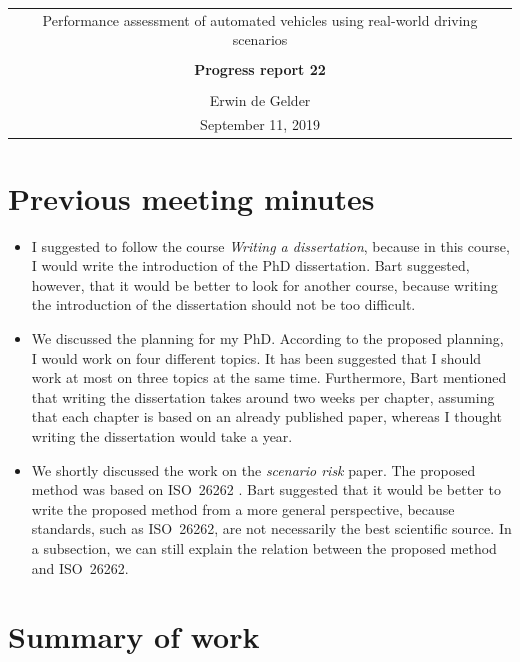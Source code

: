 \documentclass[10pt,final,a4paper,oneside,onecolumn]{article}
\newcommand{\progressreportnumber}{22}
\renewcommand{\author}{Erwin de Gelder}
\renewcommand{\date}{September 11, 2019}
\renewcommand{\title}{Performance assessment of automated vehicles using real-world driving scenarios}
\begin{document}
	
\begin{center}
	\begin{tabular}{c}
		\title \\ \\
		\textbf{\huge Progress report \progressreportnumber} \\ \\
		\author \\ 
		\date
	\end{tabular}
\end{center}

\section{Previous meeting minutes}

\begin{itemize}
	\item I suggested to follow the course \emph{Writing a dissertation}, because in this course, I would write the introduction of the PhD dissertation. Bart suggested, however, that it would be better to look for another course, because writing the introduction of the dissertation should not be too difficult. 
	\item We discussed the planning for my PhD. According to the proposed planning, I would work on four different topics. It has been suggested that I should work at most on three topics at the same time. Furthermore, Bart mentioned that writing the dissertation takes around two weeks per chapter, assuming that each chapter is based on an already published paper, whereas I thought writing the dissertation would take a year.
	\item We shortly discussed the work on the \emph{scenario risk} paper. The proposed method was based on ISO~26262 \cite{ISO26262}. Bart suggested that it would be better to write the proposed method from a more general perspective, because standards, such as ISO~26262, are not necessarily the best scientific source. In a subsection, we can still explain the relation between the proposed method and ISO~26262.
\end{itemize}

\section{Summary of work}
\end{document}
